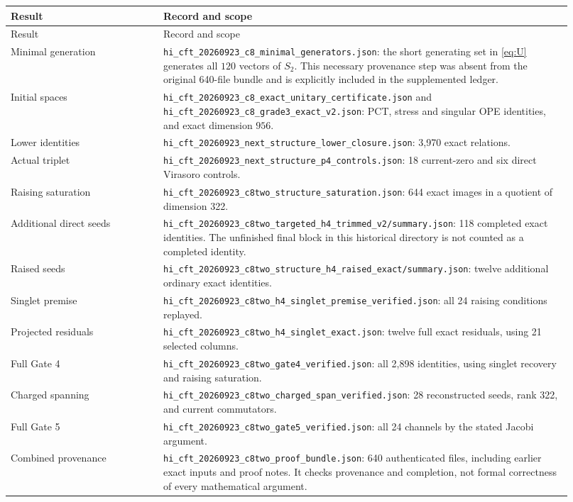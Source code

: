 \documentclass[11pt,a4paper]{article}
\theoremstyle{definition}
\newcommand{\artifact}[1]{\textnormal{\nolinkurl{#1}}}
\begin{document}
\begin{longtable}{@{}p{0.25\linewidth}p{0.67\linewidth}@{}}
\toprule
Result & Record and scope\\
\midrule\endfirsthead
\toprule Result & Record and scope\\\midrule\endhead
\bottomrule\endfoot
Minimal generation &
\artifact{hi_cft_20260923_c8_minimal_generators.json}:
the short generating set in \eqref{eq:U} generates all $120$ vectors
of $S_2$. This necessary provenance step was absent from the original
640-file bundle and is explicitly included in the supplemented ledger.\\
Initial spaces &
\artifact{hi_cft_20260923_c8_exact_unitary_certificate.json}
and \artifact{hi_cft_20260923_c8_grade3_exact_v2.json}:
PCT, stress and singular OPE identities, and exact dimension $956$.\\
Lower identities &
\artifact{hi_cft_20260923_next_structure_lower_closure.json}:
3,970 exact relations.\\
Actual triplet &
\artifact{hi_cft_20260923_next_structure_p4_controls.json}:
18 current-zero and six direct Virasoro controls.\\
Raising saturation &
\artifact{hi_cft_20260923_c8two_structure_saturation.json}:
644 exact images in a quotient of dimension 322.\\
Additional direct seeds &
\artifact{hi_cft_20260923_c8two_targeted_h4_trimmed_v2/summary.json}:
118 completed exact identities. The unfinished final block in this
historical directory is not counted as a completed identity.\\
Raised seeds &
\artifact{hi_cft_20260923_c8two_structure_h4_raised_exact/summary.json}:
twelve additional ordinary exact identities.\\
Singlet premise &
\artifact{hi_cft_20260923_c8two_h4_singlet_premise_verified.json}:
all 24 raising conditions replayed.\\
Projected residuals &
\artifact{hi_cft_20260923_c8two_h4_singlet_exact.json}:
twelve full exact residuals, using 21 selected columns.\\
Full Gate 4 &
\artifact{hi_cft_20260923_c8two_gate4_verified.json}:
all 2,898 identities, using singlet recovery and raising saturation.\\
Charged spanning &
\artifact{hi_cft_20260923_c8two_charged_span_verified.json}:
28 reconstructed seeds, rank 322, and current commutators.\\
Full Gate 5 &
\artifact{hi_cft_20260923_c8two_gate5_verified.json}:
all 24 channels by the stated Jacobi argument.\\
Combined provenance &
\artifact{hi_cft_20260923_c8two_proof_bundle.json}:
640 authenticated files, including earlier exact inputs and proof notes.
It checks provenance and completion, not formal correctness of every
mathematical argument.\\
\end{longtable}
\end{document}

